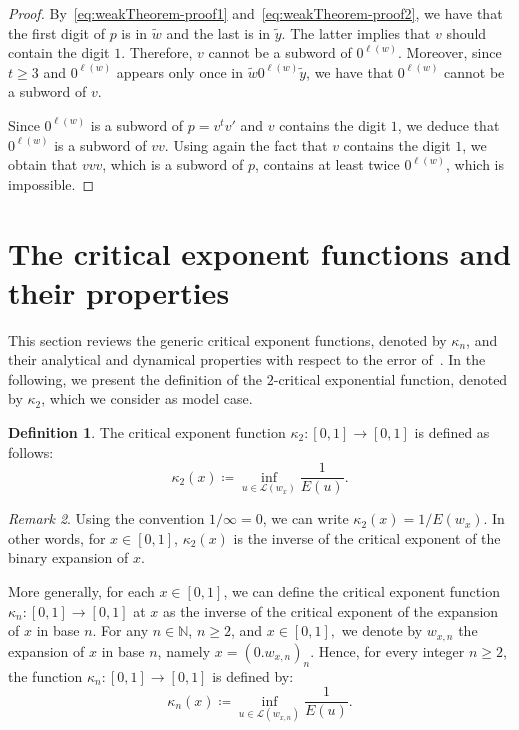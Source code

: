 \documentclass[12pt]{article}
\theoremstyle{plain}\newtheorem{teo}{Theorem}
\theoremstyle{plain}\newtheorem{proposition}[teo]{Proposition}
\theoremstyle{plain}\newtheorem{lemma}[teo]{Lemma}
\theoremstyle{plain}\newtheorem{corollary}[teo]{Corollary}
\theoremstyle{plain}\newtheorem{conjecture}[teo]{Conjecture}
\theoremstyle{definition}\newtheorem{definition}[teo]{Definition}
\theoremstyle{remark}\newtheorem{remark}[teo]{Remark}
\theoremstyle{definition}\newtheorem{example}[teo]{Example}
\numberwithin{teo}{section}
\numberwithin{equation}{section}
\begin{document}
\begin{proof}
	By~\eqref{eq:weakTheorem-proof1}
	and~\eqref{eq:weakTheorem-proof2},
	we have that the first digit of $p$ is in $\tilde{w}$	and the last 
	is in $\tilde{y}$.
	The latter implies that $v$ should contain the digit $1$.
	Therefore, $v$ cannot be a subword of $0^{\ell(w)}$.
	Moreover, since $t\ge 3$ and $0^{\ell(w)}$
	appears only once in $\tilde{w}0^{\ell(w)}\tilde{y}$,
	we have that $0^{\ell(w)}$ cannot be a subword of $v$.

	Since $0^{\ell(w)}$ is a subword of $p = v^tv'$
	and $v$ contains the digit $1$,
	we deduce that 
	$0^{\ell(w)}$ is a subword of $vv$. Using again the fact that $v$ contains the digit $1$,
	we obtain that 
	$vvv$, which is a subword of $p$,
	contains at least twice $0^{\ell(w)}$,
	which is impossible.
\end{proof}



\section{The critical exponent functions and their properties}
\label{sec:properties}
This section reviews the generic critical exponent functions,
denoted by $\kappa_n$,
and their analytical and dynamical properties
with respect to the error of~\cite[Theorem 7]{Critical}. 
In the following, we present the definition of the $2$-critical exponential function, denoted by $\kappa_2$,  which we consider as model case.

\begin{definition}
	The critical exponent function
	$\kappa_2\colon [0,1]\to [0,1]$ is defined as follows:
	\begin{equation*}
		\kappa_2(x) \coloneqq \inf_{u \in \mathcal{L}(w_x)} \frac{1}{E(u)}.
	\end{equation*}
\end{definition}
\begin{remark}
	Using the convention $1/\infty = 0$,
	we can write 
	$\kappa_2(x) = 1/E(w_x)$.
	In other words, for $x\in[0,1]$, $\kappa_2(x)$ is 
	the inverse of the critical exponent 
	of the binary expansion of $x$.
\end{remark}

More generally,  for each $x \in [0,1]$, we can define the critical 
exponent function $\kappa_n\colon [0,1] \to [0,1]$
at $x$ as the inverse of the critical exponent 
of the expansion of $x$ in base $n$.
For any $n \in \mathbb{N}$, $n \ge 2$,
and $x\in[0,1],$  we denote by $w_{x,n}$
the expansion of $x$ in base $n$, namely
$x = (0.w_{x,n})_n$.
Hence, for every integer $n \ge 2$, the function 
$\kappa_n\colon [0,1]\to [0,1]$ is defined by:
\begin{equation*}
	\kappa_n(x) \coloneqq \inf_{u \in \mathcal{L}(w_{x,n})}\frac{1}{E(u)}.
\end{equation*}
\end{document}
